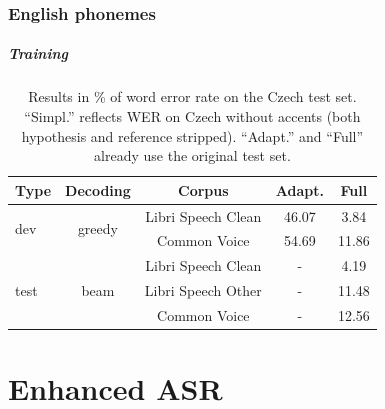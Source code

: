 \subsection{English phonemes}
\paragraph{Training}

\begin{table}[t]
	\small\centering
	\begin{tabular}{lcc|cc}
		\bf Type & \bf Decoding & \bf Corpus & \bf Adapt. & \bf Full \\
		\hline
		\multirow{2}{*}{dev} & \multirow{2}{*}{greedy} & Libri Speech Clean & 46.07 &   3.84 \\

		&& Common Voice & 54.69 &  11.86 \\
		
		\hline

		\multirow{3}{*}{test} & \multirow{3}{*}{beam} & Libri Speech Clean & - &  4.19  \\
		
		 && Libri Speech Other & - &  11.48  \\

		&& Common Voice & - &  12.56  \\
	\end{tabular}
	\caption{Results in \% of word error rate on the Czech test set. ``Simpl.'' reflects WER on Czech without accents (both hypothesis and reference stripped). ``Adapt.'' and ``Full'' already use the original test set.}
	\label{tab:en_phon_results}
\end{table}





\chapter{Enhanced ASR}
\label{chap:enhanced_asr}

